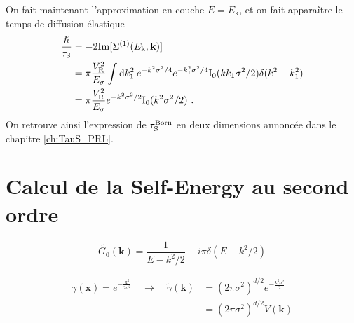 On fait maintenant l'approximation en couche $E=E_{\mathrm{k}}$, et on fait apparaître le temps de diffusion élastique
\begin{align}
\frac{\hslash}{\tau_{\mathrm{S}}}&=-2\mathrm{Im}[\Sigma^{(1)}(E_{\mathrm{k}},\mathbf{k})] \\
&= \pi \frac{V_{\mathrm{R}}^2}{E_{\sigma}} \int{\mathop{}\mathopen{}\mathrm{d}k_{\mathrm{1}}^2 \: e^{-k^2\sigma^2 /4} e^{-k_{\mathrm{1}}^2\sigma^2/4} \mathrm{I_0}(k k_{\mathrm{1}} \sigma^2 /2) \delta(k^2-k_{\mathrm{1}}^2)} \\
&= \pi \frac{V_{\mathrm{R}}^2}{E_{\sigma}} e^{-k^2\sigma^2/2} \mathrm{I_0}(k^2\sigma^2/2) \text{ .}
\end{align}
On retrouve ainsi l'expression de $\tau_{\mathrm{S}}^{\mathrm{Born}}$ en deux dimensions annoncée dans le chapitre \ref{ch:TauS_PRL}.






\section{Calcul de la Self-Energy au second ordre}



\begin{equation}
\widetilde{G_0}(\mathbf{k})=\frac{1}{E-k^2/2}-i \pi \delta(E-k^2/2)
\end{equation}

\begin{align}
\gamma(\mathbf{x})=e^{-\frac{\mathrm{x}^2}{2\sigma^2}} \quad \rightarrow \quad \tilde{\gamma}(\mathbf{k}) &= (2\pi \sigma^2)^{d/2} e^{-\frac{k^2\sigma^2}{2}} \\
&= (2\pi \sigma^2)^{d/2} V(\mathbf{k})
\end{align}

